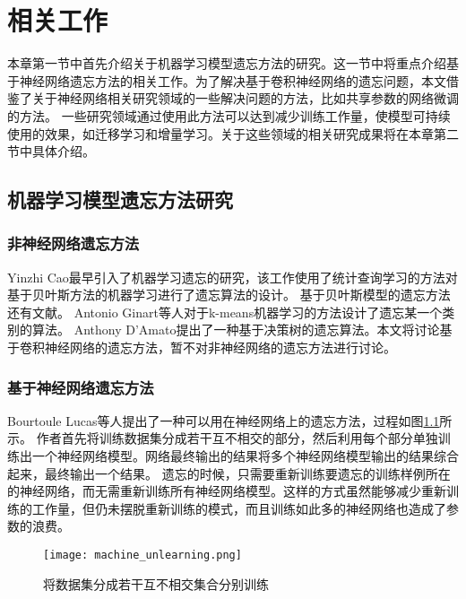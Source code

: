 
\chapter{相关工作}

本章第一节中首先介绍关于机器学习模型遗忘方法的研究。这一节中将重点介绍基于神经网络遗忘方法的相关工作。为了解决基于卷积神经网络的遗忘问题，本文借鉴了关于神经网络相关研究领域的一些解决问题的方法，比如共享参数的网络微调的方法。
一些研究领域通过使用此方法可以达到减少训练工作量，使模型可持续使用的效果，如迁移学习和增量学习。关于这些领域的相关研究成果将在本章第二节中具体介绍。

\section{机器学习模型遗忘方法研究}
\subsection{非神经网络遗忘方法}
Yinzhi Cao\cite{yinzhicao2015}最早引入了机器学习遗忘的研究，该工作使用了统计查询学习\cite{10.1145/293347.293351}的方法对基于贝叶斯方法的机器学习进行了遗忘算法的设计。
基于贝叶斯模型的遗忘方法还有文献\cite{10.1145/3196494.3196517}。
Antonio Ginart等人\cite{antonio2019}对于k-means机器学习的方法设计了遗忘某一个类别的算法。
Anthony D’Amato\cite{10.1007/978-3-319-40159-1_19}提出了一种基于决策树的遗忘算法。本文将讨论基于卷积神经网络的遗忘方法，暂不对非神经网络的遗忘方法进行讨论。

\subsection{基于神经网络遗忘方法}
Bourtoule Lucas等人\cite{2019arXiv191203817B}提出了一种可以用在神经网络上的遗忘方法，过程如图\ref{fig:machine_unlearning}所示。
作者首先将训练数据集分成若干互不相交的部分，然后利用每个部分单独训练出一个神经网络模型。网络最终输出的结果将多个神经网络模型输出的结果综合起来，最终输出一个结果。
遗忘的时候，只需要重新训练要遗忘的训练样例所在的神经网络，而无需重新训练所有神经网络模型。这样的方式虽然能够减少重新训练的工作量，但仍未摆脱重新训练的模式，而且训练如此多的神经网络也造成了参数的浪费。
\begin{figure}
    \centering
    \texttt{[image: machine\_unlearning.png]}
    \caption{将数据集分成若干互不相交集合分别训练}
    \label{fig:machine_unlearning}
\end{figure}

